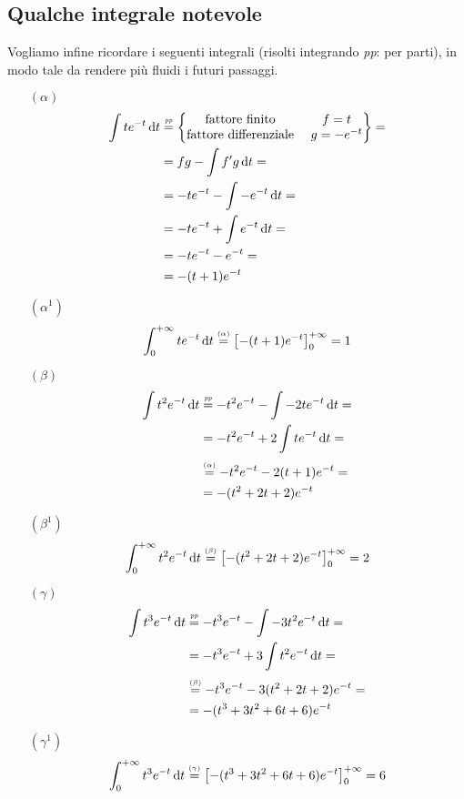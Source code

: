 \subsection{Qualche integrale notevole}
 Vogliamo infine ricordare i seguenti integrali (risolti integrando \textit{pp}: per parti), in modo tale da rendere più fluidi i futuri passaggi.
\begin{enumerate}
\item [$(\alpha)$]
\begin{gather*}
\begin{aligned}
\int te^{-t}\, \mathrm{d} t&\overset{\underset{\textit{pp}}{}}{=}\begin{Bmatrix}
\text{fattore finito }&f=t \\ \text{fattore differenziale }&g=-e^{-t}
\end{Bmatrix}=  \\
&=fg-\int f'g\, \mathrm{d} t=\\
&=-te^{-t}-\int-e^{-t}\, \mathrm{d} t=\\
&=-te^{-t}+\int e^{-t}\, \mathrm{d} t=\\
&=-te^{-t}-e^{-t}=\\
&=-(t+1)e^{-t}
\end{aligned}
\end{gather*}
\item [$(\alpha^1)$]
\begin{equation*}
\int_0^{+\infty} te^{-t}\, \mathrm{d} t\overset{\underset{(\alpha)}{}}{=}\left[-(t+1)e^{-t}\right]_0^{+\infty}=1
\end{equation*}
\item [$(\beta)$]
\begin{gather*}
\begin{aligned}
\int t^2e^{-t}\, \mathrm{d} t&\overset{\underset{\textit{pp}}{}}{=}-t^2e^{-t}-\int-2te^{-t}\, \mathrm{d} t=\\
&=-t^2e^{-t}+2\int te^{-t}\, \mathrm{d} t=\\
&\overset{\underset{(\alpha)}{}}{=}-t^2e^{-t}-2(t+1)e^{-t}=\\
&=-(t^2+2t+2)e^{-t}
\end{aligned}
\end{gather*}
\item [$(\beta^1)$]
\begin{equation*}
\int_0^{+\infty} t^2e^{-t}\, \mathrm{d} t\overset{\underset{(\beta)}{}}{=}\left[-(t^2+2t+2)e^{-t}\right]_0^{+\infty}=2
\end{equation*}
\item [$(\gamma)$]
\begin{gather*}
\begin{aligned}
\int t^3e^{-t}\, \mathrm{d} t&\overset{\underset{\textit{pp}}{}}{=}-t^3e^{-t}-\int-3t^2e^{-t}\, \mathrm{d} t=\\
&=-t^3e^{-t}+3\int t^2e^{-t}\, \mathrm{d} t=\\
&\overset{\underset{(\beta)}{}}{=}-t^3e^{-t}-3(t^2+2t+2)e^{-t}=\\
&=-(t^3+3t^2+6t+6)e^{-t}
\end{aligned}
\end{gather*}
\item [$(\gamma^1)$]
\begin{equation*}
\int_0^{+\infty} t^3e^{-t}\, \mathrm{d} t\overset{\underset{(\gamma)}{}}{=}\left[-(t^3+3t^2+6t+6)e^{-t}\right]_0^{+\infty}=6
\end{equation*}


\end{enumerate}
